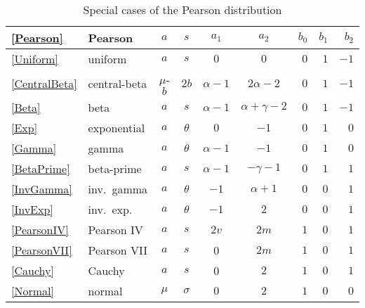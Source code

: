 \begin{table*}[tb]
\begin{center}
\caption[Pearson distribution -- Special cases]{Special cases of the Pearson distribution}
\label{PearsonTable2}
{\renewcommand{\arraystretch}{1.25} 
\begin{tabular}{llccccrrr}
\\
\eqref{Pearson}  & Pearson & $a$ & $s$ & $a_1$ & $a_2$  & $b_0$ & $b_1$ & $b_2$ \\
\hline
\eqref{Uniform} 	& uniform 		&  $a$  &  $s$  &  $0$  &  $0$    &     $0$    & $1$ & $-1$  \checked\\
\eqref{CentralBeta} 	& central-beta 	&  $\mu$-$b$  &  $2b$  &  $\alpha-1$  &  $2\alpha-2$    &    $0$   & $1$ &$-1$ \checked\\
\eqref{Beta}     		& {beta} 		&  $a$  &  $s$  &  $\alpha-1$  &  $\alpha+\gamma-2$  &  $0$    &    $1$    &  $-1$  \checked \\
\eqref{Exp} 		& exponential 	&  $a$  &  $\theta$  &  $0$  &  $-1$    &    $0$    & $1$ & $0$ \checked \\
\eqref{Gamma} 	& gamma 		&  $a$  &  $\theta$  &  $\alpha-1$  &  $-1$    &    $0$    & $1$ & $0$ \checked \\
\eqref{BetaPrime} 	& {beta-prime} 	&  $a$  &  $s$  &  $\alpha-1$  &  $-\gamma-1$  &  $0$    &    $1$    &  $1$\\
\eqref{InvGamma} 	& inv.~gamma 	&  $a$  &  $\theta$  &  $-1$  &  $\alpha+1$  &      $0$    & $0$ & $1$ \checked \\
\eqref{InvExp} 		& inv.~exp.&$a$ &  $\theta$  &  $-1$  &  $2$    &     $0$    & $0$ & $1$ \checked \\
\eqref{PearsonIV} 	& {Pearson IV} 	&  $a$  &  $s$  &  $2v$  &  $2m$  &  $1$    &    $0$    & $1$\\
\eqref{PearsonVII} 	& Pearson VII 	&  $a$  &  $s$  &  0  &  $2m$  &  $1$    &    $0$    & $1$ \checked\\
\eqref{Cauchy} 	& Cauchy 		&  $a$  &  $s$  &  0  &  $2$  &    $1$    &    $0$    & $1$  \checked \\
\eqref{Normal} 		& normal 		&$\mu$&  $\sigma$  &  $0$  &  $2$    &    $1$    &    $0$    & $0$ \\
\end{tabular} 
}
\end{center}
\end{table*}

